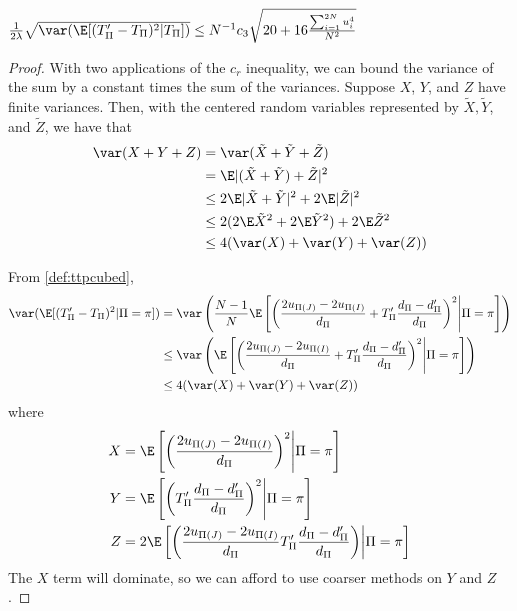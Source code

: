 \begin{proposition}
  \label{P:P2}
  $\frac{1}{2\lambda} \sqrt{\var (\E [(T_{\Pi}'-T_{\Pi})^2|T_{\Pi}])} \leq
  N^{-1} c_3\sqrt{20 + 16\frac{\sum_{i=1}^{2N} u_{i}^4}{N^2}}$
\end{proposition}
\begin{proof}
  With two applications of the $c_r$ inequality, we can bound the variance of the sum by a constant
times the sum of the variances.  Suppose $X$, $Y$, and $Z$ have finite variances.  Then, with the
centered random variables represented by $\tilde{X}, \tilde{Y}$, and $\tilde{Z}$, we have that
  \begin{align*}
    \var(X + Y + Z)
    &= \var(\tilde{X}+\tilde{Y}+\tilde{Z}) \\
    &= \E|(\tilde{X}+\tilde{Y})+\tilde{Z}|^2 \\
    &\leq 2 \E |\tilde{X}+\tilde{Y}|^2 + 2\E |\tilde{Z}|^2 \\
    &\leq 2(2\E \tilde{X}^2 + 2\E \tilde{Y}^2) + 2\E \tilde{Z}^2 \\
    &\leq 4(\var(X) + \var(Y) + \var(Z))
  \end{align*}

  From \eqref{def:ttpcubed},
  \begin{align*}
    \var (\E[(T_{\Pi}'-T_{\Pi})^2 | \Pi = \pi]) &= \var \left ( \frac{N-1}{N}\E \left [
      \left ( \frac{2u_{\Pi(J)}-2u_{\Pi(I)}}{d_{\Pi}}+T_{\Pi}'\frac{d_{\Pi}-d_{\Pi}'}{d_{\Pi}} \right )^2
        \middle | \Pi = \pi \right ] \right ) \\
    &\leq \var \left ( \E \left [
      \left ( \frac{2u_{\Pi(J)}-2u_{\Pi(I)}}{d_{\Pi}}+T_{\Pi}'\frac{d_{\Pi}-d_{\Pi}'}{d_{\Pi}} \right )^2
        \middle | \Pi = \pi \right ] \right ) \\
    &\leq 4(\var(X) + \var(Y) + \var(Z))
  \end{align*}
  where
  \begin{align*}
    X &= \E \left [ \left ( \frac{2u_{\Pi(J)}-2u_{\Pi(I)}}{d_{\Pi}} \right )^2
        \middle | \Pi = \pi \right ] \\
    Y &= \E \left [ \left
          ( T_{\Pi}'\frac{d_{\Pi}-d_{\Pi}'}{d_{\Pi}} \right )^2 \middle | \Pi = \pi \right ] \\
    Z &= 2 \E \left [ \left ( \frac{2u_{\Pi(J)}-2u_{\Pi(I)}}{d_{\Pi}}
         T_{\Pi}'\frac{d_{\Pi}-d_{\Pi}'}{d_{\Pi}} \right ) \middle | \Pi = \pi \right ]
  \end{align*}
  The $X$ term will dominate, so we can afford to use coarser methods on $Y$ and $Z$.


\end{proof}
